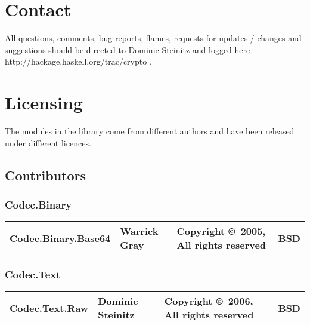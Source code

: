 \documentclass{article}
\begin{document}
\section{Contact}

All questions, comments, bug reports, flames, requests for 
updates / changes and suggestions should be directed to Dominic Steinitz and
logged
\htmladdnormallinkfoot
{here}
{http://hackage.haskell.org/trac/crypto}
.
\section{Licensing}

The modules in the library come from different authors and have been 
released under different licences. 

\subsection{Contributors}

\subsubsection{Codec.Binary}
\begin{tabular}{|p{6cm}|p{3cm}|p{3cm}|p{1cm}|}
\hline\hline
Codec.Binary.Base64 & Warrick Gray & 
Copyright \copyright\ 2005, All rights reserved & BSD \\
\hline\hline
\end{tabular}

\subsubsection{Codec.Text}
\begin{tabular}{|p{6cm}|p{3cm}|p{3cm}|p{1cm}|}
\hline\hline
Codec.Text.Raw & Dominic Steinitz & 
Copyright \copyright\ 2006, All rights reserved & BSD \\
\hline\hline
\end{tabular}
\end{document}
